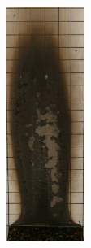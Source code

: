 \documentclass[twoside]{uocthesis}
\begin{document}
{\begin{figure}[p]
	\includegraphics[width=1.0in]{../Figures/GBNG28_P5130434} \\


\end{figure}}
\end{document}
